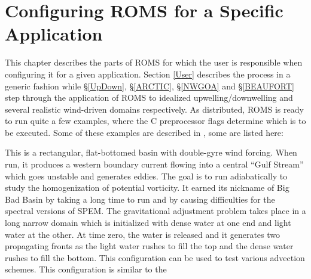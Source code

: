 \section{Configuring ROMS for a Specific Application}
\label{Wave}
This chapter describes the parts of ROMS for which the user is
responsible when configuring it for a given application.  Section
\ref{User} describes the process in a generic fashion while
\S\ref{UpDown}, \S\ref{ARCTIC}, \S\ref{NWGOA} and \S\ref{BEAUFORT}
step through the application of ROMS to idealized upwelling/downwelling
and several realistic wind-driven domains respectively.  As
distributed, ROMS is ready to run quite a few examples, where the
C preprocessor flags determine which is to be executed.  Some of
these examples are described in \citet{Haidvogel99}, some are listed
here:
\begin{klist}
    This is a rectangular, flat-bottomed basin with
 double-gyre wind forcing. When run, it produces a western boundary
 current flowing into a central ``Gulf Stream''
 which goes unstable and generates eddies. The goal is to run
 adiabatically to study the homogenization of potential vorticity.
 It earned its nickname of Big Bad Basin by taking a long time to
 run and by causing difficulties for the spectral versions of SPEM.
    The gravitational adjustment problem takes place
 in a long narrow domain which is initialized with dense water at one
 end and light water at the other. At time zero, the water is released
 and it generates two propagating fronts as the light water rushes to
 fill the top and the dense water rushes to fill the bottom. This
 configuration can be used to test various advection schemes.
      This configuration is similar to the

\end{klist}
